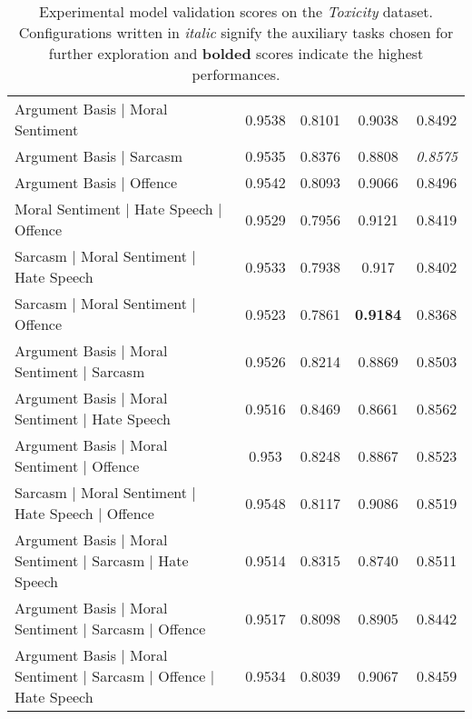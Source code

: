 \begin{table}[]
{\begin{tabular}{l|cccc}
    Argument Basis | Moral Sentiment                                   & 0.9538          & 0.8101          & 0.9038          & 0.8492          \\
    Argument Basis | Sarcasm                                           & 0.9535          & 0.8376          & 0.8808          & \textit{0.8575} \\
    Argument Basis | Offence                                           & 0.9542          & 0.8093          & 0.9066          & 0.8496          \\
    Moral Sentiment | Hate Speech | Offence                            & 0.9529          & 0.7956          & 0.9121          & 0.8419          \\
    Sarcasm | Moral Sentiment | Hate Speech                            & 0.9533          & 0.7938          & 0.917           & 0.8402          \\
    Sarcasm | Moral Sentiment | Offence                                & 0.9523          & 0.7861          & \textbf{0.9184} & 0.8368          \\
    Argument Basis | Moral Sentiment | Sarcasm                         & 0.9526          & 0.8214          & 0.8869          & 0.8503          \\
    Argument Basis | Moral Sentiment | Hate Speech                     & 0.9516          & 0.8469          & 0.8661          & 0.8562          \\
    Argument Basis | Moral Sentiment | Offence                         & 0.953           & 0.8248          & 0.8867          & 0.8523          \\
    Sarcasm | Moral Sentiment | Hate Speech | Offence                  & 0.9548          & 0.8117          & 0.9086          & 0.8519          \\
    Argument Basis | Moral Sentiment | Sarcasm | Hate Speech           & 0.9514          & 0.8315          & 0.8740          & 0.8511          \\
    Argument Basis | Moral Sentiment | Sarcasm | Offence               & 0.9517          & 0.8098          & 0.8905          & 0.8442          \\
    Argument Basis | Moral Sentiment | Sarcasm | Offence | Hate Speech & 0.9534          & 0.8039          & 0.9067          & 0.8459
  \end{tabular}%
  }
  \caption{Experimental model validation scores on the \textit{Toxicity} dataset. Configurations written in \textit{italic} signify the auxiliary tasks chosen for further exploration and \textbf{bolded} scores indicate the highest performances.}
  \label{tab:mtl_dev_wulczyn}
\end{table}

